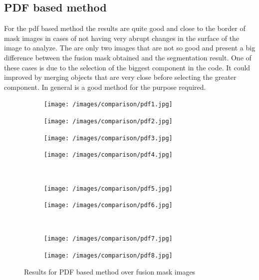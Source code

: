 \documentclass[a4paper, 10pt, conference]{ieeeconf}        %
\begin{document}
\subsection{PDF based method}
For the pdf based method the  results are quite good and close to the border of mask images in cases of not having very abrupt changes in the surface of the image to analyze. The are only two images that are not so good and present a big difference between the fusion mask obtained and the segmentation result. One of these cases is due to the selection of the biggest component in the code. It could improved by merging objects that are very close before selecting the greater component. In general is a good method for the purpose required.
\begin{figure}[ht!]
  \centering
  \begin{subfigure}{0.45\linewidth}
  \texttt{[image: /images/comparison/pdf1.jpg]}
  \caption{}
  \end{subfigure}
   \begin{subfigure}{0.45\linewidth}
   \texttt{[image: /images/comparison/pdf2.jpg]}
   \caption{}
   \end{subfigure}
     \begin{subfigure}{0.45\linewidth}
     \texttt{[image: /images/comparison/pdf3.jpg]}
     \caption{}
     \end{subfigure}
       \begin{subfigure}{0.45\linewidth}
       \texttt{[image: /images/comparison/pdf4.jpg]}
       \caption{}
       \end{subfigure}\\
        \begin{subfigure}{0.45\linewidth}
        \texttt{[image: /images/comparison/pdf5.jpg]}
        \caption{}
        \end{subfigure}
          \begin{subfigure}{0.45\linewidth}
          \texttt{[image: /images/comparison/pdf6.jpg]}
          \caption{}
          \end{subfigure}\\
            \begin{subfigure}{0.45\linewidth}
            \texttt{[image: /images/comparison/pdf7.jpg]}
            \caption{}
            \end{subfigure}
             \begin{subfigure}{0.45\linewidth}
             \texttt{[image: /images/comparison/pdf8.jpg]}
             \caption{}
             \end{subfigure}
  \caption{Results for PDF based method over fusion mask images}
  \label{pdfResults}
  \end{figure}
\clearpage
\end{document}
